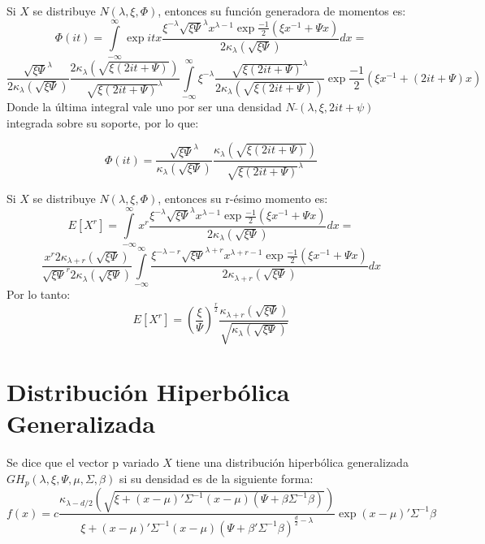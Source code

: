 \documentclass[11pt]{book}
\begin{document}
Si $X$ se distribuye $N\tilde{}(\lambda,\xi,\Phi)$, entonces su función generadora de momentos es:
\begin{equation*}
\Phi (it)=\underset{-\infty }{\overset{\infty }{\int }}\exp{itx}\dfrac{\xi^{-\lambda}\sqrt{\xi\Psi}^{\lambda}x^{\lambda-1}\exp{\frac{-1}{2}(\xi x^{-1} + \Psi x)}}{2\kappa_{\lambda}(\sqrt{\xi\Psi})}dx=
\end{equation*}
\begin{equation*}
\frac{\sqrt{\xi\Psi}^{\lambda}}{2\kappa_{\lambda}(\sqrt{\xi\Psi})}\frac{2\kappa_{\lambda}(\sqrt{\xi(2it + \Psi)})}{\sqrt{\xi(2it + \Psi)}^{\lambda}}\underset{-\infty }{\overset{\infty }{\int }}\xi^{-\lambda}\frac{\sqrt{\xi(2it + \Psi)}^{\lambda}}{2\kappa_{\lambda}(\sqrt{\xi(2it + \Psi)})}\exp{\frac{-1}{2}(\xi x^{-1} + (2it+\Psi) x)}
\end{equation*}
Donde la última integral vale uno por ser una densidad $N\bar{}(\lambda,\xi,2it + \psi)$ integrada sobre su soporte, por lo que:

\begin{equation*}
\Phi(it)=\frac{\sqrt{\xi\Psi}^{\lambda}}{\kappa_{\lambda}(\sqrt{\xi\Psi})}\frac{\kappa_{\lambda}(\sqrt{\xi(2it + \Psi)})}{\sqrt{\xi(2it + \Psi)}^{\lambda}}
\end{equation*}

Si $X$ se distribuye $N\tilde{}(\lambda,\xi,\Phi)$, entonces su r-ésimo momento es:
\begin{equation*}
E[X^{r}]=\underset{-\infty }{\overset{\infty }{\int }}x^{r}\dfrac{\xi^{-\lambda}\sqrt{\xi\Psi}^{\lambda}x^{\lambda-1}\exp{\frac{-1}{2}(\xi x^{-1} + \Psi x)}}{2\kappa_{\lambda}(\sqrt{\xi\Psi})}dx=
\end{equation*}
\begin{equation*}
\frac{x^{r}2\kappa_{\lambda+r}(\sqrt{\xi\Psi})}{\sqrt{\xi\Psi}^{r}2\kappa_{\lambda}(\sqrt{\xi\Psi})}\underset{-\infty }{\overset{\infty }{\int }}\dfrac{\xi^{-\lambda-r}\sqrt{\xi\Psi}^{\lambda+r}x^{\lambda+r-1}\exp{\frac{-1}{2}(\xi x^{-1} + \Psi x)}}{2\kappa_{\lambda+r}(\sqrt{\xi\Psi})}dx
\end{equation*}
Por lo tanto:
\begin{equation*}
E[X^{r}]=(\frac{\xi}{\Psi})^{\frac{r}{2}}\frac{\kappa_{\lambda+r}(\sqrt{\xi \Psi})}{\sqrt{\kappa_{\lambda}(\sqrt{\xi\Psi})}}
\end{equation*}
\section*{Distribución Hiperbólica Generalizada}
Se dice que el vector p variado $X$ tiene una distribución hiperbólica generalizada $GH_{p}(\lambda,\xi,\Psi,\mu,\Sigma,\beta)$ si su densidad es de la siguiente forma:
\begin{equation*}
f(x)=c\frac{\kappa_{\lambda-d/2}(\sqrt{\xi +(x-\mu)'\Sigma^{-1}(x-\mu)(\Psi+\beta\acute{}\Sigma^{-1}\beta)})}{\xi + (x-\mu)'\Sigma^{-1}(x-\mu)(\Psi+\beta'\Sigma^{-1}\beta)^{\frac{d}{2}-\lambda}}\exp{(x-\mu)'\Sigma^{-1}\beta}
\end{equation*}
\end{document}
